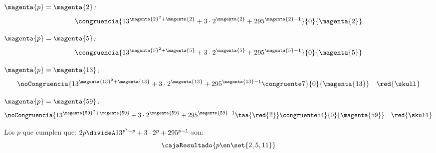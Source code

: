 \bigskip

\textit{$\magenta{p} = \magenta{2}$:}
$$
  \congruencia{ 13^{\magenta{2}^2 + \magenta{2}} + 3 \cdot 2^{\magenta{2}} + 295^{\magenta{2}-1} }{0}{\magenta{2}}
$$

\textit{$\magenta{p} = \magenta{5}$:}
$$
  \congruencia{ 13^{\magenta{5}^2 + \magenta{5}} + 3 \cdot 2^{\magenta{5}} + 295^{\magenta{5}-1} }{0}{\magenta{5}}
$$

\textit{$\magenta{p} = \magenta{13}$:}
$$
  \noCongruencia{ 13^{\magenta{13}^2 + \magenta{13}} + 3 \cdot 2^{\magenta{13}} + 295^{\magenta{13}-1} \congruente 7}{0}{\magenta{13}} \quad \red{\skull}
$$

\textit{$\magenta{p} = \magenta{59}$:}
$$
  \noCongruencia{
    13^{\magenta{59}^2 + \magenta{59}} + 3 \cdot 2^{\magenta{59}} + 295^{\magenta{59}-1}
    \taa{\red{!!}}\congruente 54
  }{0}{\magenta{59}} \quad \red{\skull}
$$

\bigskip

Los $p$ que cumplen que:
$
  2p \divideA 13^{p^2 + p} + 3 \cdot 2^p + 295^{p-1}
$
son:
$$
  \cajaResultado{
    p \en \set{2, 5, 11}
  }
$$

\begin{aportes}
  \item {}
  \item {}
\end{aportes}
